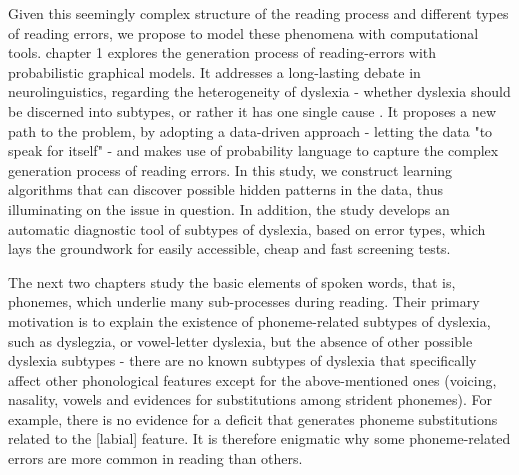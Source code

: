 Given this seemingly complex structure of the reading process and different types of reading errors, we propose to model these phenomena with computational tools. chapter 1 explores the generation process of reading-errors with probabilistic graphical models. It addresses a long-lasting debate in neurolinguistics, regarding the heterogeneity of dyslexia - whether dyslexia should be discerned into subtypes, or rather it has one single cause \citep{s98, s00}. It proposes a new path to the problem, by adopting a data-driven approach - letting the data "to speak for itself" - and makes use of probability language to capture the complex generation process of reading errors. In this study, we construct learning algorithms that can discover possible hidden patterns in the data, thus illuminating on the issue in question. In addition, the study develops an automatic diagnostic tool of subtypes of dyslexia, based on error types, which lays the groundwork for easily accessible, cheap and fast screening tests. 

The next two chapters study the basic elements of spoken words, that is, phonemes, which underlie many sub-processes during reading. Their primary motivation is to explain the existence of phoneme-related subtypes of dyslexia, such as dyslegzia, or vowel-letter dyslexia, but the absence of other possible dyslexia subtypes - there are no known subtypes of dyslexia that specifically affect other phonological features except for the above-mentioned ones (voicing, nasality, vowels and evidences for substitutions among strident phonemes). For example, there is no evidence for a deficit that generates phoneme substitutions related to the [labial] feature. It is therefore enigmatic why some phoneme-related errors are more common in reading than others.

